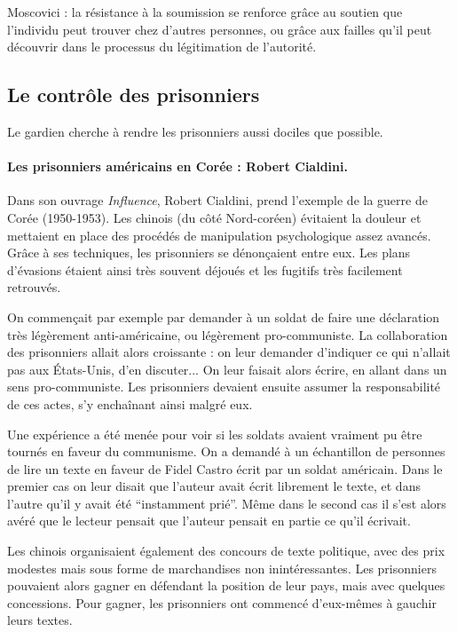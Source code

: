 	Moscovici : la résistance à la soumission se renforce grâce au soutien que l’individu peut trouver chez d’autres personnes, ou grâce aux failles qu’il peut découvrir dans le processus du légitimation de l’autorité.

\subsection{Le contrôle des prisonniers}

	Le gardien cherche à rendre les prisonniers aussi dociles que possible.

	\paragraph{Les prisonniers américains en Corée : Robert Cialdini.}

	Dans son ouvrage \textit{Influence}, Robert Cialdini, prend l'exemple de la guerre de Corée (1950-1953).
	Les chinois (du côté Nord-coréen) évitaient la douleur et mettaient en place des procédés de manipulation psychologique assez avancés.
	Grâce à ses techniques, les prisonniers se dénonçaient entre eux.
	Les plans d'évasions étaient ainsi très souvent déjoués et les fugitifs très facilement retrouvés.

	On commençait par exemple par demander à un soldat de faire une déclaration très légèrement anti-américaine, ou légèrement pro-communiste.
	La collaboration des prisonniers allait alors croissante : on leur demander d'indiquer ce qui n'allait pas aux États-Unis, d'en discuter...
	On leur faisait alors écrire, en allant dans un sens pro-communiste.
	Les prisonniers devaient ensuite assumer la responsabilité de ces actes, s'y enchaînant ainsi malgré eux.

	Une expérience a été menée pour voir si les soldats avaient vraiment pu être tournés en faveur du communisme.
	On a demandé à un échantillon de personnes de lire un texte en faveur de Fidel Castro écrit par un soldat américain.
	Dans le premier cas on leur disait que l'auteur avait écrit librement le texte, et dans l'autre qu'il y avait été “instamment prié”.
	Même dans le second cas il s'est alors avéré que le lecteur pensait que l'auteur pensait en partie ce qu'il écrivait.

	Les chinois organisaient également des concours de texte politique, avec des prix modestes mais sous forme de marchandises non inintéressantes.
	Les prisonniers pouvaient alors gagner en défendant la position de leur pays, mais avec quelques concessions.
	Pour gagner, les prisonniers ont commencé d'eux-mêmes à gauchir leurs textes.

